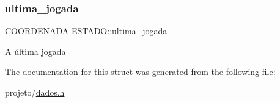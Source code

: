 \subsubsection{\texorpdfstring{ultima\+\_\+jogada}{ultima\_jogada}}
{\footnotesize\ttfamily \hyperlink{structCOORDENADA}{C\+O\+O\+R\+D\+E\+N\+A\+DA} E\+S\+T\+A\+D\+O\+::ultima\+\_\+jogada}

A última jogada 

The documentation for this struct was generated from the following file\+:\begin{DoxyCompactItemize}
\item 
projeto/\hyperlink{dados_8h}{dados.\+h}\end{DoxyCompactItemize}
